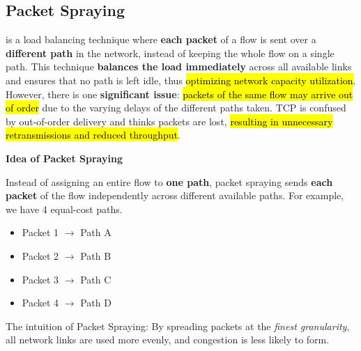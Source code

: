 \subsection{Packet Spraying}

 is a load balancing technique where \textbf{each packet} of a flow is sent over a \textbf{different path} in the network, instead of keeping the whole flow on a single path. This technique \textbf{balances the load immediately} across all available links and ensures that no path is left idle, thus \hl{optimizing network capacity utilization}. However, there is one \textbf{significant issue}: \hl{packets of the same flow may arrive out of order} due to the varying delays of the different paths taken. TCP is confused by out-of-order delivery and thinks packets are lost, \hl{resulting in unnecessary retransmissions and reduced throughput}.

\highspace
\begin{flushleft}
    \textcolor{Green3}{ \textbf{Idea of Packet Spraying}}
\end{flushleft}
Instead of assigning an entire flow to \textbf{one path}, packet spraying sends \textbf{each packet} of the flow independently across different available paths. For example, we have 4 equal-cost paths.
\begin{itemize}
    \item Packet 1 $\rightarrow$ Path A
    \item Packet 2 $\rightarrow$ Path B
    \item Packet 3 $\rightarrow$ Path C
    \item Packet 4 $\rightarrow$ Path D
\end{itemize}
The intuition of Packet Spraying: By spreading packets at the \emph{finest granularity}, all network links are used more evenly, and congestion is less likely to form.

